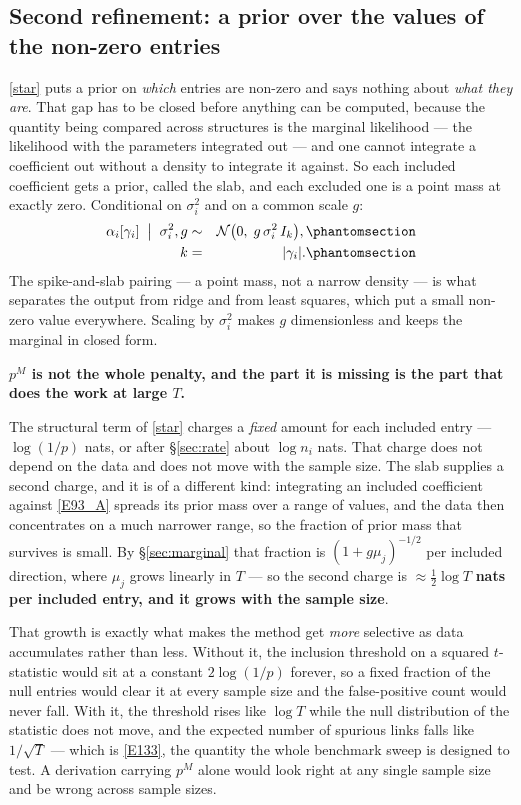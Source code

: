 \subsection[Second refinement: the slab]{Second refinement: a prior over the values of the non-zero
entries}\label{sec:slab}

\eqref{star} puts a prior on \emph{which} entries are non-zero and says nothing about
\emph{what they are}. That gap has to be closed before anything can be computed,
because the quantity being compared across structures is the marginal likelihood ---
the likelihood with the parameters integrated out --- and one cannot integrate a
coefficient out without a density to integrate it against. So each included
coefficient gets a prior, called the slab, and each excluded one is a point mass at
exactly zero. Conditional on $\sigma_i^2$ and on a common scale $g$:
\begin{eqnarray}
\alpha_i[\gamma_i] \;\bigm|\; \sigma_i^2, g &\sim&
  \mathcal{N}\bigl(0,\; g\,\sigma_i^2\, I_k\bigr),
  \Elabel{E-93A}{E93_A} \\
k &=& |\gamma_i|.
  \Elabel{E-93B}{E93_B}
\end{eqnarray}
The spike-and-slab pairing --- a point mass, not a narrow density --- is what
separates the output from ridge and from least squares, which put a small non-zero
value everywhere. Scaling by $\sigma_i^2$ makes $g$ dimensionless and keeps the
marginal in closed form.

\begin{recordbox}
\textbf{$p^M$ is not the whole penalty, and the part it is missing is the part that
does the work at large $T$.}

The structural term of \eqref{star} charges a \emph{fixed} amount for each included
entry --- $\log(1/p)$ nats, or after \S\ref{sec:rate} about $\log n_i$ nats. That
charge does not depend on the data and does not move with the sample size. The slab
supplies a second charge, and it is of a different kind: integrating an included
coefficient against \eqref{E93_A} spreads its prior mass over a range of values, and
the data then concentrates on a much narrower range, so the fraction of prior mass
that survives is small. By \S\ref{sec:marginal} that fraction is
$(1+g\mu_j)^{-1/2}$ per included direction, where $\mu_j$ grows linearly in $T$ ---
so the second charge is $\approx\frac12\log T$ \textbf{nats per included entry, and
it grows with the sample size}.

That growth is exactly what makes the method get \emph{more} selective as data
accumulates rather than less. Without it, the inclusion threshold on a squared
$t$-statistic would sit at a constant $2\log(1/p)$ forever, so a fixed fraction of
the null entries would clear it at every sample size and the false-positive count
would never fall. With it, the threshold rises like $\log T$ while the null
distribution of the statistic does not move, and the expected number of spurious
links falls like $1/\sqrt{T}$ --- which is \eqref{E133}, the quantity the whole
benchmark sweep is designed to test. A derivation carrying $p^M$ alone would look
right at any single sample size and be wrong across sample sizes.
\end{recordbox}

